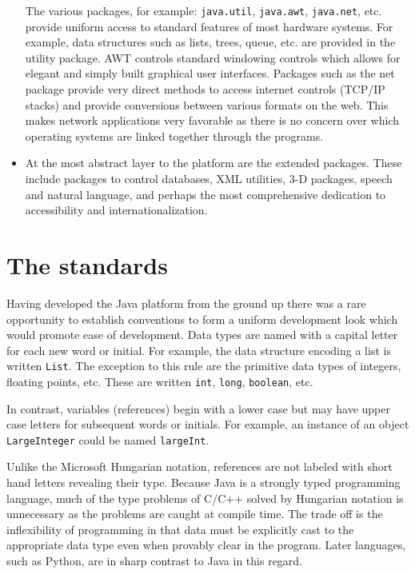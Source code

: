 \documentclass[12pt]{article}
\begin{document}
\begin{itemize}
The various packages, for example: \texttt{java.util}, \texttt{java.awt}, \texttt{java.net}, etc. provide uniform access to standard features of most
hardware systems.  For example, data structures such as lists, trees, queue, etc. are provided in the utility package.  AWT controls standard windowing controls which allows for elegant and simply built graphical user interfaces.  Packages such as the net package provide very direct methods to access internet controls (TCP/IP stacks) and provide conversions between 
various formats on the web.  This makes network applications very favorable
as there is no concern over which operating systems are linked together
through the programs.

\item At the most abstract layer to the platform are the extended packages.
These include packages to control databases, XML utilities, 3-D packages, 
speech and natural language, and perhaps the most comprehensive dedication to
accessibility and internationalization.
\end{itemize}

\section{The standards}

Having developed the Java platform from the ground up there was a rare opportunity to establish conventions to form a uniform development look
which would promote ease of development.  Data types are named with a capital
letter for each new word or initial.  For example, the data structure
encoding a list is written \texttt{List}.  The exception to this rule
are the primitive data types of integers, floating points, etc.  These
are written \texttt{int}, \texttt{long}, \texttt{boolean}, etc.  

In contrast, variables (references) begin with a lower case but may have
upper case letters for subsequent words or initials.  For example,
an instance of an object \texttt{LargeInteger} could be named 
\texttt{largeInt}.  

Unlike the Microsoft Hungarian notation, references are not labeled with
short hand letters revealing their type.  Because Java is a strongly typed
programming language, much of the type problems of C/C++ solved by Hungarian
notation is unnecessary as the problems are caught at compile time.  The trade off is the inflexibility of programming in that data must be explicitly cast 
 to the appropriate data type even when provably clear in the 
program.  Later languages, such as Python, are in sharp contrast to Java in this
regard.
\end{document}
